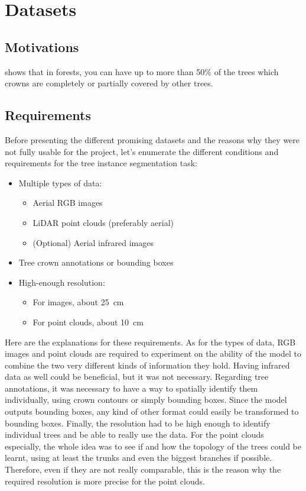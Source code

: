 \documentclass[
]{report}
\providecommand{\tightlist}{%
  \setlength{\itemsep}{0pt}\setlength{\parskip}{0pt}}\usepackage{longtable,booktabs,array}
\begin{document}
\section{Datasets}\label{datasets}

\subsection{Motivations}\label{motivations}

\autocite{lidar_benchmark_2} shows that in forests, you can have up to
more than 50\% of the trees which crowns are completely or partially
covered by other trees.

\subsection{Requirements}\label{requirements}

Before presenting the different promising datasets and the reasons why
they were not fully usable for the project, let's enumerate the
different conditions and requirements for the tree instance segmentation
task:

\begin{itemize}
\tightlist
\item
  Multiple types of data:

  \begin{itemize}
  \tightlist
  \item
    Aerial RGB images
  \item
    LiDAR point clouds (preferably aerial)
  \item
    (Optional) Aerial infrared images
  \end{itemize}
\item
  Tree crown annotations or bounding boxes
\item
  High-enough resolution:

  \begin{itemize}
  \tightlist
  \item
    For images, about 25~cm
  \item
    For point clouds, about 10~cm
  \end{itemize}
\end{itemize}

Here are the explanations for these requirements. As for the types of
data, RGB images and point clouds are required to experiment on the
ability of the model to combine the two very different kinds of
information they hold. Having infrared data as well could be beneficial,
but it was not necessary. Regarding tree annotations, it was necessary
to have a way to spatially identify them individually, using crown
contours or simply bounding boxes. Since the model outputs bounding
boxes, any kind of other format could easily be transformed to bounding
boxes. Finally, the resolution had to be high enough to identify
individual trees and be able to really use the data. For the point
clouds especially, the whole idea was to see if and how the topology of
the trees could be learnt, using at least the trunks and even the
biggest branches if possible. Therefore, even if they are not really
comparable, this is the reason why the required resolution is more
precise for the point clouds.
\end{document}
